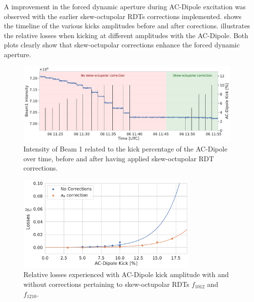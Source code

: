 A improvement in the forced dynamic aperture during AC-Dipole excitation was observed with the
earlier skew-octupolar RDTs corrections implemented. 
shows the timeline of the various kicks amplitudes before and after corections.
 illustrates the relative losses when kicking at different
amplitudes with the AC-Dipole. Both plots clearly show that skew-octupolar corrections enhance the
forced dynamic aperture.

\begin{figure}[!htb]
    \centering
    \includegraphics[width=1\textwidth]{./images/timeline_losses_with_without_a4corr.pdf}
    \caption{Intensity of Beam 1 related to the kick percentage of the AC-Dipole over time, before
    and after having applied skew-octupolar RDT corrections.}
    \label{fig:decapoles:losses_a4_corrs_timeline}
\end{figure}

\begin{figure}[!htb]
    \centering
    \includegraphics[width=0.8\textwidth]{./images/losses_with_without_a4corr.pdf}
    \caption{Relative losses experienced with AC-Dipole kick amplitude with and without corrections
    pertaining to skew-octupolar RDTs $f_{1012}$ and $f_{1210}$.}
    \label{fig:decapoles:losses_a4_corrs}
\end{figure}



\FloatBarrier
